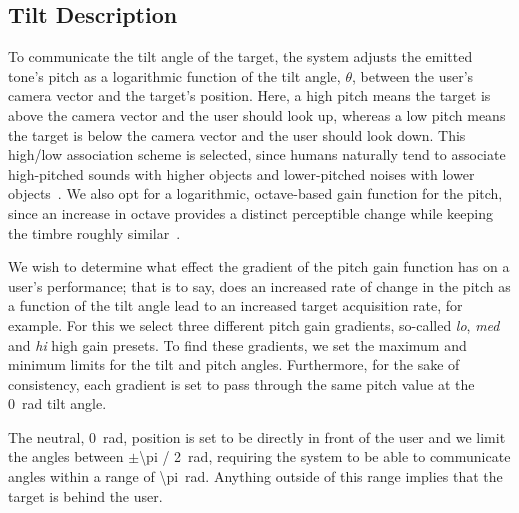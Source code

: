 \documentclass[format=sigconf, review=true, screen=true, anonymous=true]{acmart}
\begin{document}


\subsection{Tilt Description}

To communicate the tilt angle of the target, the system adjusts the emitted tone's pitch as a logarithmic function of the tilt angle, $\theta$, between the user's camera vector and the target's position. Here, a high pitch means the target is above the camera vector and the user should look up, whereas a low pitch means the target is below the camera vector and the user should look down. This high/low association scheme is selected, since humans naturally tend to associate high-pitched sounds with higher objects and lower-pitched noises with lower objects~\cite{pratt1930spatial}. We also opt for a logarithmic, octave-based gain function for the pitch, since an increase in octave provides a distinct perceptible change while keeping the timbre roughly similar~\cite{shepard1964circularity}.

We wish to determine what effect the gradient of the pitch gain function has on a user's performance; that is to say, does an increased rate of change in the pitch as a function of the tilt angle lead to an increased target acquisition rate, for example. For this we select three different pitch gain gradients, so-called \emph{lo}, \emph{med} and \emph{hi} high gain presets. To find these gradients, we set the maximum and minimum limits for the tilt and pitch angles. Furthermore, for the sake of consistency, each gradient is set to pass through the same pitch value at the \SI{0}{\radian} tilt angle.   

The neutral, \SI{0}{\radian}, position is set to be directly in front of the user and we limit the angles between $\pm$\SI[quotient-mode=fraction]{\pi / 2}{\radian}, requiring the system to be able to communicate angles within a range of \SI{\pi}{\radian}. Anything outside of this range implies that the target is behind the user. 
\end{document}
